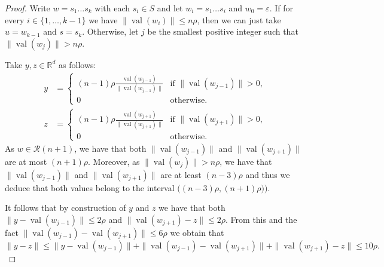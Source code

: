 \documentclass[10pt,a4paper]{amsart}
\newcommand{\RR}{\mathbb{R}}
\newcommand{\norm}[1]{\|{#1}\|}
\newcommand{\val}{\operatorname{val}}
\begin{document}
    \begin{proof}
        Write $w=s_1\dots s_k$ with each $s_i \in S$ and let $w_i = s_1\dots s_i$ and $w_0 = \varepsilon$. If for every $i\in \{1,\dots,k-1\}$ we have $\norm{\val(w_i)}\leq n\rho$, then we can just take $u = w_{k-1}$ and $s = s_k$. Otherwise, let $j$ be the smallest positive integer such that $\norm{\val(w_j)}>n \rho$.

        Take $y,z \in \RR^d$ as follows:
        \begin{align*}
            y & = \begin{cases}
            (n-1)\rho\frac{\val(w_{j-1})}{\norm{\val(w_{j-1})}} & \mbox{if } \norm{\val(w_{j-1})} > 0,\\
            0 & \mbox{otherwise}.
        \end{cases}\\
        z & = \begin{cases}
            (n-1)\rho\frac{\val(w_{j+1})}{\norm{\val(w_{j+1})}} & \mbox{if } \norm{\val(w_{j+1})} > 0,\\
            0 & \mbox{otherwise}.
        \end{cases} 
        \end{align*}
        As $w\in \mathcal{R}(n+1)$, we have that both $\norm{\val(w_{j-1})}$ and $\norm{\val(w_{j+1})}$ are at most $(n+1)\rho$. Moreover, as $\norm{\val(w_j)}>n \rho$, we have that $\norm{\val(w_{j-1})}$ and $\norm{\val(w_{j+1})}$ are at least $(n-3)\rho$ and thus we deduce that both values belong to the interval $\bigl( (n-3)\rho, (n+1)\rho)\bigr)$.
        
        It follows that by construction of $y$ and $z$ we have that both $\norm{y-\val(w_{j-1})} \leq 2\rho$ and $\norm{\val(w_{j+1})-z}\leq 2\rho$. From this and the fact $\norm{\val(w_{j-1})- \val(w_{j+1})}\leq 6\rho$ we obtain that
        \[ \norm{y-z} \leq \norm{y-\val(w_{j-1})} + \norm{\val(w_{j-1})- \val(w_{j+1})} + \norm{ \val(w_{j+1})-z} \leq 10\rho.   \]


\end{proof}
\end{document}
